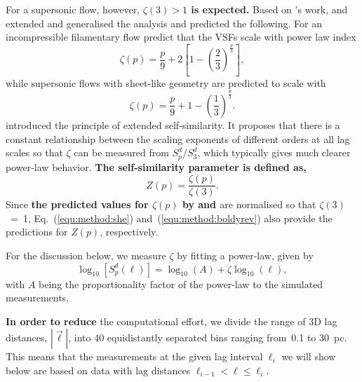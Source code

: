 For a supersonic flow, however, \textbf{$\zeta(3) >1$ is expected.}
Based on \citeauthor{Kolmogorov1941}'s work, \citet{She1994} and \citet{Boldyrev2002} extended and generalised the analysis and predicted the following.
For an incompressible filamentary flow \citet{She1994} predict that
the VSFs scale with
    power law index
\begin{equation}
	\zeta(p) = \frac{p}{9} + 2 \left[ 1 - \left( \frac{2}{3} \right)^{\frac{p}{3}} \right] ,
    \label{equ:method:she}
\end{equation}
while supersonic flows with sheet-like geometry are 
     predicted
to scale with \citep{Boldyrev2002}
\begin{equation}
	 \zeta(p) = \frac{p}{9} + 1 - \left( \frac{1}{3} \right)^{\frac{p}{3}}.
    \label{equ:method:boldyrev}
\end{equation}
\citet{Benzi1993} introduced the principle of extended self-similarity.
It proposes that there is a constant relationship between the scaling
exponents of different orders at all lag scales
     so that $\zeta$ can be measured from $S^d_p/S^d_3$, which
     typically gives much clearer power-law behavior.
\textbf{The self-similarity parameter is defined as,}
\begin{equation}
	Z(p) = \frac{\zeta(p)}{\zeta(3)}.
	\label{equ:method:z_def}
\end{equation} 
Since \textbf{the predicted values for $\zeta(p)$ by \citet{She1994} and \citet{Boldyrev2002}} are normalised so that $\zeta(3)$~=~1, Eq.~(\ref{equ:method:she}) and~(\ref{equ:method:boldyrev}) also provide the predictions for $Z(p)$, respectively.

For the discussion below, we measure $\zeta$ by fitting a power-law,
given by
\begin{equation}
	\log_{10}\left[ S^d_p(\ell) \right] = \log_{10}\left(A\right) + \zeta \log_{10}(\ell) ,
    \label{equ:method:fitting}
\end{equation}
with $A$ being the proportionality factor of the power-law to the simulated measurements.

\textbf{In order to reduce} the computational effort, we divide the range of 3D lag distances, $|\vec{\ell}|$, into 40 equidistantly separated bins ranging from~0.1 to 30~pc.
This means that the measurements at the given lag interval $\ell_i$ we will show below are based on data with lag distances $\ell_{i-1} < \ell \leq \ell_i$.

